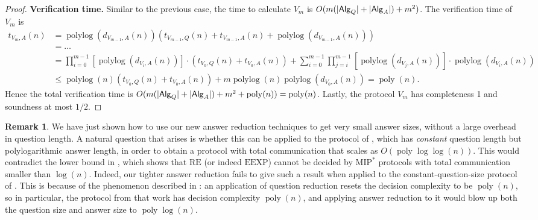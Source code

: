 \documentclass[11pt]{article}
\theoremstyle{plain}
\theoremstyle{definition}
\newtheorem{remark}[theorem]{Remark}
\DeclarePairedDelimiter{\abs}{\lvert}{\rvert}
\newcommand{\poly} {\ensuremath{\operatorname{poly}}}
\newcommand{\polylog} {\ensuremath{\operatorname{polylog}}}
\newcommand{\1}{\mathbb{1}} %
\newcommand{\Alg}{\mathsf{Alg}}
\newcommand{\MIP}{\mathrm{MIP}}
\newcommand{\RE}{\mathrm{RE}}
\begin{document}
\begin{proof}
\textbf{Verification time.} Similar to the previous case, the time to calculate $V_m$ is
$O( m(\abs{\Alg_{Q}} + \abs{\Alg_{A}}) + m^2)$.
The verification time of $V_m$ is
\begin{align*}
    t_{V_m,A}(n) &= \polylog(d_{V_{m-1},A}(n))(t_{V_{m-1},Q}(n) + t_{V_{m-1},A}(n) + \polylog(d_{V_{m-1},A}(n))) \\
    & = \ldots \\
    & = \prod_{i=0}^{m-1} [\polylog(d_{V_i,A}(n))] \cdot (t_{V_0, Q}(n) + t_{V_0,A}(n)) + \sum_{i=0}^{m-1} \prod_{j=i}^{m-1} [\polylog(d_{V_j,A}(n))] \cdot 
    \polylog(d_{V_{i},A}(n)) \\
    & \leq \polylog(n) (t_{V_0, Q}(n) + t_{V_0,A}(n)) + m \polylog(n) \polylog(d_{V_0,A}(n)) = \poly(n).
\end{align*}
Hence the total verification time is $O( m(\abs{\Alg_{Q}} + \abs{\Alg_{A}}) + m^2 + \poly(n)) = \poly(n)$.
Lastly, the protocol $V_m$ has completeness 1 and soundness at most $1/2$.

\end{proof}

\begin{remark}
We have just shown how to use our new answer reduction techniques to get very small answer sizes, without a large overhead in question length. A natural question that arises is whether this can be applied to the protocol of \cite{ 10.1145/3564246.3585208}, which has \emph{constant} question length but polylogarithmic answer length, in order to obtain a protocol with total communication that scales as $O(\poly\log\log(n))$. This would contradict the lower bound in \cite{ 10.1145/3564246.3585208}, which shows that $\RE$ (or indeed $\mathrm{EEXP}$) cannot be decided by $\MIP^*$ protocols with total communication smaller than $\log(n)$. Indeed, our tighter answer reduction fails to give such a result when applied to the constant-question-size protocol of \cite{ 10.1145/3564246.3585208}. This is because of the phenomenon described in : an application of question reduction resets the decision complexity to be $\poly(n)$, so in particular, the protocol from that work has decision complexity $\poly(n)$, and applying answer reduction to it would blow up both the question size and answer size to $\poly\log(n)$.
\end{remark}







\appendix
\end{document}
